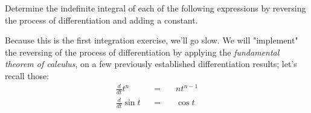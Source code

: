 \documentclass[solutions.tex]{subfiles}
\begin{document}
\maketitle
\begin{exercise} Determine the indefinite integral
of each of the following expressions by reversing the process
of differentiation and adding a constant.
\end{exercise}
Because this is the first integration exercise, we'll go slow.
We will "implement" the reversing of the process of differentiation
by applying the \textit{fundamental theorem of calculus}, on a few
previously established differentiation results; let's recall those:
\begin{equation*} \begin{aligned}
	\frac{d}{dt}t^n &&=\quad& nt^{n-1} \\
	\frac{d}{dt}\sin t &&=\quad& \cos t
\end{aligned} \end{equation*}
\end{document}
